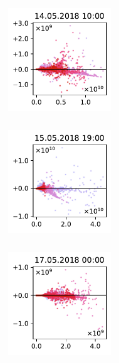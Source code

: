 \begin{figure}[H]
    \centering
    \begin{subfigure}
        \centering
        \includegraphics[width=0.30\textwidth,valign=t]{evaluation/figures/perturbations/perturbation-14.05.2018:10.00-sesquiterpenes-div-1.5.pdf}
    \end{subfigure}
    \begin{subfigure}
        \centering
        \includegraphics[width=0.30\textwidth,valign=t]{evaluation/figures/perturbations/perturbation-15.05.2018:19.00-sesquiterpenes-div-1.5.pdf}
    \end{subfigure}
    \begin{subfigure}
        \centering
        \includegraphics[width=0.30\textwidth,valign=t]{evaluation/figures/perturbations/perturbation-17.05.2018:00.00-sesquiterpenes-div-1.5.pdf}
    \end{subfigure}


\end{figure}
